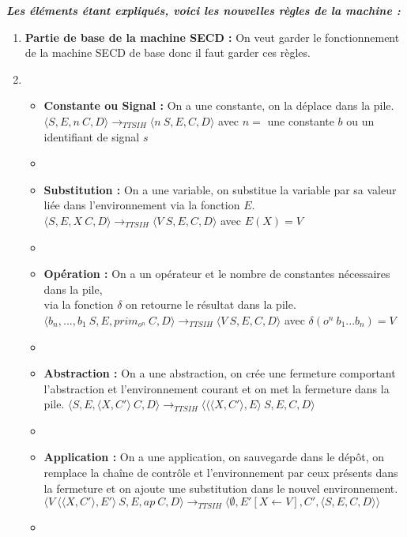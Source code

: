 \documentclass[10pt,a4paper]{report}
\begin{document}
	\textbf{\textit{Les éléments étant expliqués, voici les nouvelles règles de la machine :}}
	\smallbreak
	\begin{enumerate}
		\item[] \textbf{Partie de base de la machine SECD :} On veut garder le fonctionnement de la machine SECD de base donc il faut garder ces règles.	
		\item[]
		\begin{itemize}
			\item[] \textbf{Constante ou Signal :} On a une constante, on la déplace dans la pile.
			\smallbreak
			$\langle S,E,n~C,D\rangle 
			\longrightarrow_{TTSIH} 
			\langle n~S,E,C,D\rangle$ avec $n =$ une constante $b$ ou un identifiant de signal $s$
			\item[]
			
			\item[] \textbf{Substitution :} On a une variable, on substitue la variable par sa valeur liée dans l'environnement via la fonction $E$.
			\smallbreak
			$\langle S,E,X~C,D\rangle
			\longrightarrow_{TTSIH} 
			\langle V~S,E,C,D\rangle$ avec $E(X) = V$
			\item[]
			
			\item[] \textbf{Opération :} On a un opérateur et le nombre de constantes nécessaires dans la pile, \\via la fonction $\delta$ on retourne le résultat dans la pile.
			\smallbreak
			$\langle b_{n},...,b_{1}~S,E,prim_{o^{n}}~C,D\rangle
			\longrightarrow_{TTSIH} 
			\langle V~S,E,C,D\rangle$ avec $\delta(o^{n}~b_{1}...b_{n}) = V$
			\item[]
			
			\item[]  \textbf{Abstraction :} On a une abstraction, on crée une fermeture comportant l'abstraction et l'environnement courant et on met la fermeture dans la pile.
			\smallbreak
			$\langle S,E,\langle X,C'\rangle~C,D\rangle
			\longrightarrow_{TTSIH} 
			\langle \langle\langle X,C'\rangle,E\rangle~S,E,C,D\rangle$
			\item[]
			
			\item[]  \textbf{Application :} On a une application, on sauvegarde dans le dépôt, on remplace la chaîne de contrôle et l'environnement par ceux présents dans la fermeture et on ajoute une substitution  dans le nouvel environnement.
			\smallbreak
			$\langle V~\langle\langle X,C'\rangle,E'\rangle~S,E,ap~C,D\rangle
			\longrightarrow_{TTSIH} 
			\langle \emptyset,E'[X \leftarrow V],C',\langle S,E,C,D\rangle\rangle$
			\item[] 
			

\end{itemize}
\end{enumerate}
\end{document}
